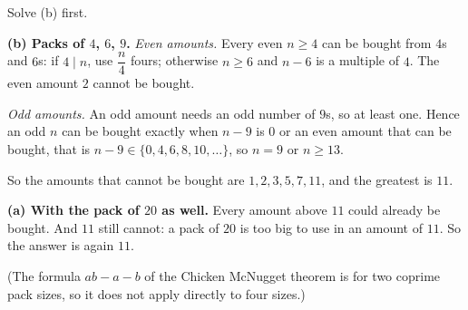 Solve (b) first.

\textbf{(b) Packs of $4$, $6$, $9$.} \emph{Even amounts.} Every even $n\ge4$ can be bought from $4$s and $6$s: if $4\mid n$, use $\dfrac {n}{4}$ fours; otherwise $n\ge6$ and $n-6$ is a multiple of $4$. The even amount $2$ cannot be bought.

\emph{Odd amounts.} An odd amount needs an odd number of $9$s, so at least one. Hence an odd $n$ can be bought exactly when $n-9$ is $0$ or an even amount that can be bought, that is $n-9\in\{0,4,6,8,10,\dots\}$, so $n=9$ or $n\ge13$.

So the amounts that cannot be bought are $1,2,3,5,7,11$, and the greatest is $\boxed{11}$.

\textbf{(a) With the pack of $20$ as well.} Every amount above $11$ could already be bought. And $11$ still cannot: a pack of $20$ is too big to use in an amount of $11$. So the answer is again $\boxed{11}$.

(The formula $ab-a-b$ of the Chicken McNugget theorem is for two coprime pack sizes, so it does not apply directly to four sizes.)
